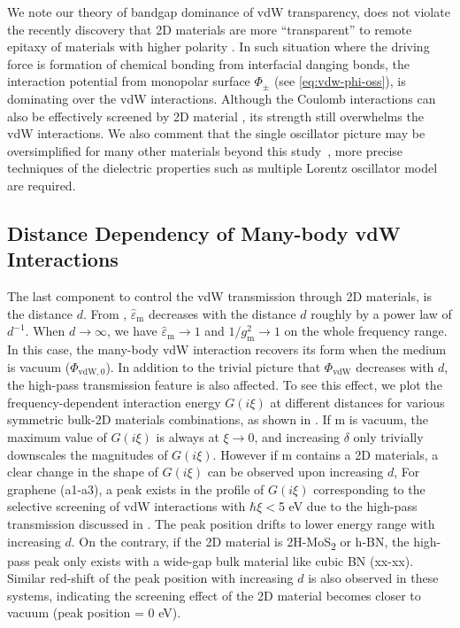 We note our theory of bandgap dominance of vdW transparency, does not
violate the recently discovery that 2D materials are more
``transparent'' to remote epitaxy of materials with higher polarity
\cite{Kong_2018_pol}. In such situation where the driving force is
formation of chemical bonding from interfacial danging bonds, the
interaction potential from monopolar surface \(\Phi_{\pm}\) (see \autoref{eq:vdw-phi-oss}), is dominating over the vdW
interactions. Although the Coulomb interactions can also be
effectively screened by 2D material
\cite{Li_2014_screen,Ambrosetti_2019_jpcl}, its strength still
overwhelms the vdW interactions. We also comment that the single
oscillator picture may be oversimplified for many other materials
beyond this study~, more precise techniques of the
dielectric properties such as multiple Lorentz oscillator model are
required.

\subsection{Distance Dependency of Many-body vdW Interactions}
\label{sec:vdw-distance}

The last component to control the vdW transmission through 2D
materials, is the distance $d$.  From , \(\hat{\varepsilon}_{\mathrm{m}}\) decreases with the
distance \(d\) roughly by a power law of \(d^{-1}\). When
\(d \to \infty\), we have \(\hat{\varepsilon}_{\mathrm{m}} \to 1\) and
\(1/g_{\mathrm{m}}^{2} \to 1\) on the whole frequency range. In this
case, the many-body vdW interaction recovers its form when the medium
is vacuum ($\Phi_{\mathrm{vdW}, 0}$).
%
In addition to the trivial picture that $\Phi_{\mathrm{vdW}}$
decreases with $d$, the
high-pass transmission feature is also affected.
%
To see this effect, we plot the frequency-dependent interaction energy
\(G(i \xi)\) at different distances for various symmetric bulk-2D
  materials combinations, as shown in
.
%
If m is vacuum, the maximum value of $G(i \xi)$ is always at
$\xi \to 0$, and increasing $\delta$ only trivially down\-scales the
magnitudes of $G(i \xi)$. However if m contains a 2D materials, a
clear change in the shape of \(G(i \xi)\) can be observed upon
increasing $d$,
%
For graphene (a1-a3), a peak exists in the profile of
\(G(i \xi)\) corresponding to the selective screening of vdW
interactions with $\hbar \xi<$5 eV due to the high-pass transmission
discussed in .
%
The peak position drifts to lower energy range with increasing $d$.
%
On the contrary, if the 2D material is 2H-MoS\textsubscript{2} or
h-BN, the high-pass peak only exists with a wide-gap bulk material
like cubic BN (xx-xx). Similar red-shift of the peak
position with increasing \(d\) is also observed in these systems,
indicating the screening effect of the 2D material becomes closer to
vacuum (peak position = 0 eV).

